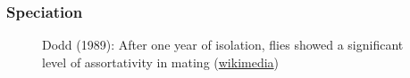 \documentclass[aspectratio=169, 9pt]{beamer}
\begin{document}
\begin{frame}[t,label=aphylo-bad]
\begin{minipage}[m]{.65\linewidth}
		
	\end{minipage}
	
	
\end{frame}




\begin{frame}[label = duplicationvsspeciation]
\frametitle{Speciation}
\begin{figure}
\centering
\def\svgwidth{.8\linewidth}
\tiny

\caption{Dodd (1989): After one year of isolation, flies showed a significant level of assortativity in mating (\href{https://commons.wikimedia.org/wiki/File:Drosophila_speciation_experiment.svg}{wikimedia})}
\end{figure}

\vfill\hfill \hyperlink{aphylographicalview}{}

\end{frame}
\end{document}
